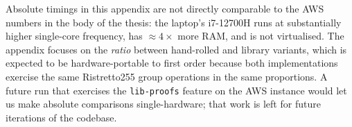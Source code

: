 \documentclass[12pt,a4paper,oneside]{report}
\begin{document}
Absolute timings in this appendix are not directly comparable to the
AWS numbers in the body of the thesis: the laptop's i7-12700H runs at
substantially higher single-core frequency, has $\approx 4\times$ more
RAM, and is not virtualised. The appendix focuses on the
\emph{ratio} between hand-rolled and library variants, which is
expected to be hardware-portable to first order because both
implementations exercise the same Ristretto255 group operations in the
same proportions. A future run that exercises the
\texttt{lib-proofs} feature on the AWS instance would let us make
absolute comparisons single-hardware; that work is left for future
iterations of the codebase.

\end{document}
